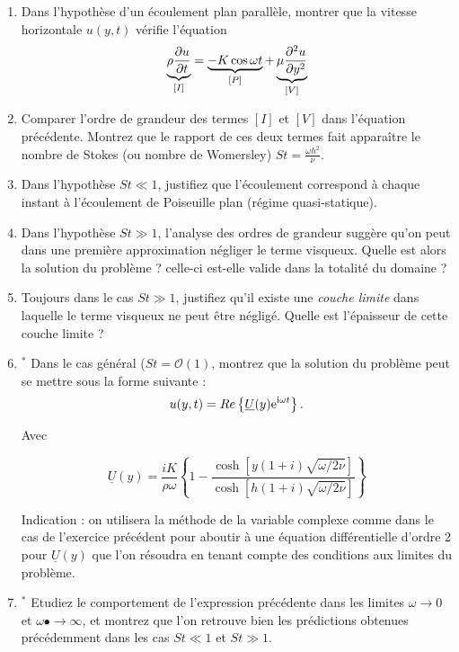 \begin{enumerate}
\item 
Dans l'hypoth\`ese d'un \'ecoulement plan parall\`ele, montrer que
la vitesse horizontale $u(y, t)$ v\'erifie l'\'equation
\begin{equation}
\underbrace{\rho \frac {\partial u} {\partial t}}_{[I]} = \underbrace{- K \cos \omega t}_{[P]} + \underbrace{\mu \frac {\partial^{2} u} {\partial y ^{2}}}_{[V]}
\label{eq:ns}
\end{equation}

\item Comparer l'ordre de grandeur des termes $[I]$ et $[V]$ dans l'équation précédente. Montrez que le rapport de ces deux termes fait apparaître 
le nombre de Stokes (ou nombre de Womersley) $St = \frac{\omega h^2  }{\nu}$.

\item Dans l'hypothèse $St \ll 1$, justifiez que l'écoulement correspond à chaque instant à l'écoulement de Poiseuille plan   
(régime quasi-statique).

\item Dans l'hypothèse $St \gg 1$, l'analyse des ordres de grandeur suggère qu'on peut dans une première approximation
négliger le terme visqueux. Quelle est alors la solution du problème ? celle-ci est-elle valide dans la totalité du domaine ?

\item Toujours dans le cas  $St \gg 1$, justifiez qu'il existe une {\em couche limite} dans laquelle le terme visqueux ne peut être négligé. 
Quelle est l'épaisseur de cette couche limite ?

\item $^*$ Dans le cas général ($St = {\mathcal O}(1)$, montrez que la solution du problème peut se mettre sous la forme suivante :
$$u(y, t) = Re \left \{  \underline{U}(y) \mathrm{e}^{\mathrm{i} \omega t} \right \}.$$

Avec 

\begin{equation}
\label{sol}
 \underline{U}(y) = \frac{iK}{\rho \omega} \left \{ 
1 - \frac{\cosh [ y ( 1+i) \sqrt{\omega / 2\nu} ]}{\cosh [ 
h ( 1+i) \sqrt{\omega / 2\nu} ]}
\right \}
\end{equation}

Indication : on utilisera la méthode de la variable complexe comme dans le cas de l'exercice précédent pour aboutir à une équation différentielle d'ordre 2 pour $ \underline{U}(y)$ que l'on résoudra en tenant compte des conditions aux limites du problème.

\item $^*$ Etudiez le comportement de l'expression précédente dans les limites  $\omega \rightarrow 0 $ et $\omega •\rightarrow \infty$, et montrez que l'on retrouve bien les prédictions obtenues précédemment dans les cas $St \ll 1$ et $St \gg 1$.

\end{enumerate}


